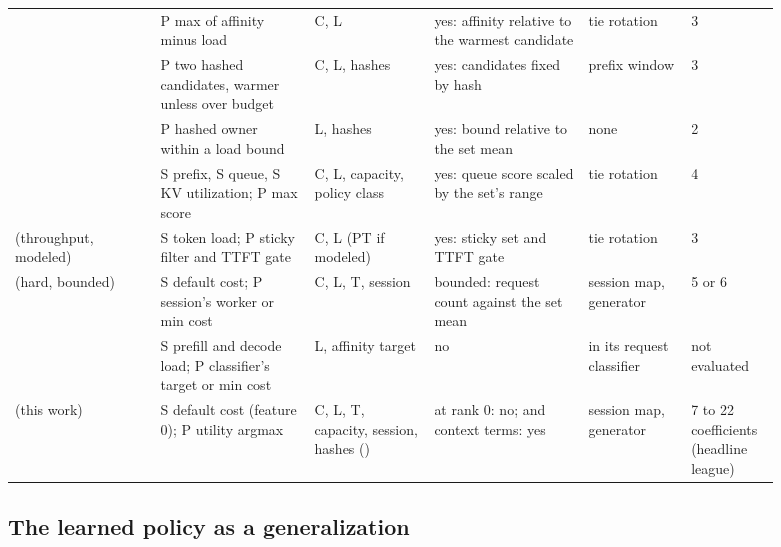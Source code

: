 {\begin{longtable}{@{}P{0.17\linewidth}P{0.18\linewidth}P{0.14\linewidth}P{0.18\linewidth}P{0.12\linewidth}P{0.1\linewidth}@{}}
 & P max of affinity minus load & C, L &
  yes: affinity relative to the warmest candidate & tie rotation & 3 \\
 & P two hashed candidates, warmer unless over budget & C, L, hashes &
  yes: candidates fixed by hash & prefix window & 3 \\
 & P hashed owner within a load bound & L, hashes &
  yes: bound relative to the set mean & none & 2 \\
\allowbreak{} & S prefix, S queue, S KV utilization; P max score & C, L,
  capacity, policy class & yes: queue score scaled by the set's range & tie rotation & 4 \\
\allowbreak{} (throughput, modeled) & S token load; P sticky filter and TTFT gate &
  C, L (PT if modeled) & yes: sticky set and TTFT gate & tie rotation & 3 \\
 (hard, bounded) & S default cost; P session's worker or min cost &
  C, L, T, session & bounded: request count against the set mean & session map, generator &
  5 or 6 \\
 & S prefill and decode load; P classifier's target or min cost & L, affinity
  target & no & in its request classifier & not evaluated \\
\midrule
\lc{} (this work) & S default cost (feature 0); P utility argmax & C, L, T, capacity, session,
  hashes () &  at rank 0: no;  and context terms: yes & session map,
  generator & 7 to 22 coefficients (headline league) \\
\end{longtable}
}

\subsection{The learned policy as a generalization}
\label{sec:api-learned}

